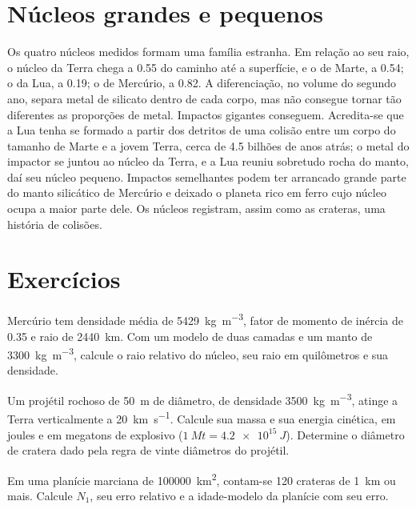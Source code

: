 \section{Núcleos grandes e pequenos}\label{sec:b3:planetary-interiors-surfaces:cores}

Os quatro núcleos medidos formam uma família estranha. Em relação ao seu raio, o núcleo da
Terra chega a 0.55 do caminho até a superfície, e o de Marte, a 0.54; o da Lua,
a 0.19; o de Mercúrio, a 0.82. A diferenciação, no volume do segundo ano,
separa metal de silicato dentro de cada corpo, mas não consegue tornar tão
diferentes as proporções de metal. Impactos gigantes conseguem. Acredita-se que
a Lua tenha se formado a partir dos detritos de uma colisão entre um corpo do
tamanho de Marte e a jovem Terra, cerca de 4.5 bilhões de anos atrás; o metal do
impactor se juntou ao núcleo da Terra, e a Lua reuniu sobretudo rocha do manto, daí seu
núcleo pequeno. Impactos semelhantes podem ter arrancado grande parte do manto
silicático de Mercúrio e deixado o planeta rico em ferro cujo núcleo ocupa a maior parte dele.
Os núcleos registram, assim como as crateras, uma história de colisões.

\section{Exercícios}

\begin{exercise}[$\star$]\label{exo:b3:planetary-interiors-surfaces:1}
Mercúrio tem densidade média de \qty{5429}{kg.m^{-3}}, fator de momento de
inércia de 0.35 e raio de \qty{2440}{km}. Com um modelo de duas camadas e um manto de
\qty{3300}{kg.m^{-3}}, calcule o raio relativo do núcleo,
seu raio em quilômetros e sua densidade.
\end{exercise}

\begin{exercise}[$\star$]\label{exo:b3:planetary-interiors-surfaces:2}
Um projétil rochoso de \qty{50}{m} de diâmetro, de densidade \qty{3500}{kg.m^{-3}},
atinge a Terra verticalmente a \qty{20}{km.s^{-1}}. Calcule sua massa
e sua energia cinética, em joules e em megatons de explosivo
($\qty{1}{Mt} = \qty{4.2e15}{J}$). Determine o diâmetro de cratera dado pela regra
de vinte diâmetros do projétil.
\end{exercise}

\begin{exercise}[$\star$]\label{exo:b3:planetary-interiors-surfaces:3}
Em uma planície marciana de \qty{100000}{km^2}, contam-se 120 crateras de \qty{1}{km} ou
mais. Calcule $N_1$, seu erro relativo e a idade-modelo da
planície com seu erro.
\end{exercise}

